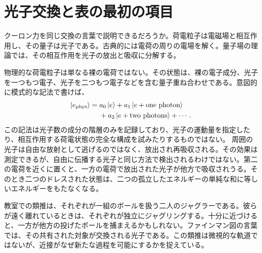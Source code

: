 \begin{classroomqa}
\end{classroomqa}

\begin{classroomqa}
\end{classroomqa}

\section{光子交換と表の最初の項目}

クーロン力を同じ交換の言葉で説明できるだろうか。荷電粒子は電磁場と相互作用し、その量子は光子である。古典的には電荷の周りの電場を解く。量子場の理論では、その相互作用を光子の放出と吸収に分解する。

物理的な荷電粒子は単なる裸の電荷ではない。その状態は、裸の電子成分、光子を一つもつ電子、光子を二つもつ電子などを含む量子重ね合わせである。意図的に模式的な記法で書けば、
\begin{equation}
\begin{aligned}
\left\lvert e_{\mathrm{phys}}\right\rangle
={}&a_0\left\lvert e\right\rangle
+a_1\left\lvert e+\text{one photon}\right\rangle
\\
&+a_2\left\lvert e+\text{two photons}\right\rangle+\cdots .
\end{aligned}
\end{equation}
この記法は光子数の成分の階層のみを記録しており、光子の運動量を指定したり、相互作用する荷電状態の完全な構成を試みたりするものではない。
周囲の光子は自由な放射として逃げるのではなく、放出され再吸収される。その効果は測定できるが、自由に伝播する光子と同じ方法で検出されるわけではない。第二の電荷を近くに置くと、一方の電荷で放出された光子が他方で吸収されうる。そのとき二つのドレスされた状態は、二つの孤立したエネルギーの単純な和に等しいエネルギーをもたなくなる。

教室での類推は、それぞれが一組のボールを扱う二人のジャグラーである。彼らが遠く離れているときは、それぞれが独立にジャグリングする。十分に近づけると、一方が他方の投げたボールを捕まえるかもしれない。ファインマン図の言葉では、その共有された対象が交換される光子である。この類推は微視的な軌道ではないが、近接がなぜ新たな過程を可能にするかを捉えている。

